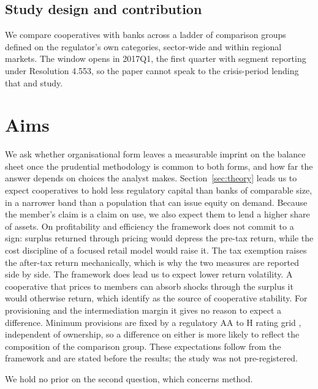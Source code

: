 \documentclass[11pt,a4paper]{article}
\begin{document}
\subsection{Study design and contribution}

We compare cooperatives with banks across a ladder of comparison groups defined on the
regulator's own categories, sector-wide and within regional markets. The window opens in
2017Q1, the first quarter with segment reporting under Resolution 4.553, so the paper
cannot speak to the crisis-period lending that \citet{becchetti2016} and
\citet{ferri2014} study.

\section{Aims}

We ask whether organisational form leaves a measurable imprint on the balance sheet once
the prudential methodology is common to both forms, and how far the answer depends on
choices the analyst makes. Section~\ref{sec:theory} leads us to expect cooperatives to
hold less regulatory capital than banks of comparable size, in a narrower band than a
population that can issue equity on demand. Because the member's claim is a claim on use,
we also expect them to lend a higher share of assets. On profitability and efficiency the
framework does not commit to a sign: surplus returned through pricing would depress the
pre-tax return, while the cost discipline of a focused retail model would raise it. The
tax exemption raises the after-tax return mechanically, which is why the two measures are
reported side by side. The framework does lead us to expect lower return volatility. A cooperative that prices to
members can absorb shocks through the surplus it would otherwise return, which
\citet{hesse2007} identify as the source of cooperative stability. For provisioning and
the intermediation margin it gives no reason to expect a difference. Minimum provisions
are fixed by a regulatory AA to H rating grid \citep{cmn2682}, independent of ownership,
so a difference on either is more likely to reflect the composition of the comparison
group. These expectations follow from the framework and are stated before the results;
the study was not pre-registered.

We hold no prior on the second question, which concerns method.
\end{document}
